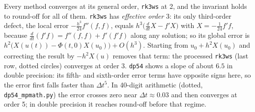 \documentclass[11pt,a4paper]{article}
\begin{document}
\begin{center}
\end{center}
Every method converges at its general order, \texttt{rk3ws} at 2, and the
invariant holds to round-off for all of them. \texttt{rk3ws} has
\emph{effective order} 3: its only third-order defect, the local error
$-\tfrac{h^3}{24}f''(f,f)$, equals $h^3\bigl(\tfrac{d}{dt}X - f'X\bigr)$ with
$X = -\tfrac1{24}f'f$, because $\tfrac{d}{dt}(f'f) = f''(f,f) + f'(f'f)$ along
any solution; so its global error is $h^2\bigl(X(u(t)) - \Phi(t,0)X(u_0)\bigr)
+ O(h^3)$. Starting from $u_0 + h^2 X(u_0)$ and correcting the result by
$-h^2X(u)$ removes that term: the processed \texttt{rk3ws} (last row, dotted
circles) converges at order 3. \texttt{dp54} shows a slope of
about $6.5$ in double precision: its fifth- and sixth-order error terms have
opposite signs here, so the error first falls faster than $\Delta t^5$. In
40-digit arithmetic (dotted, \texttt{dp54\_mpmath.py}) the error crosses zero
near $\Delta t \approx 0.03$ and then converges at order 5; in double
precision it reaches round-off before that regime.
\end{document}
